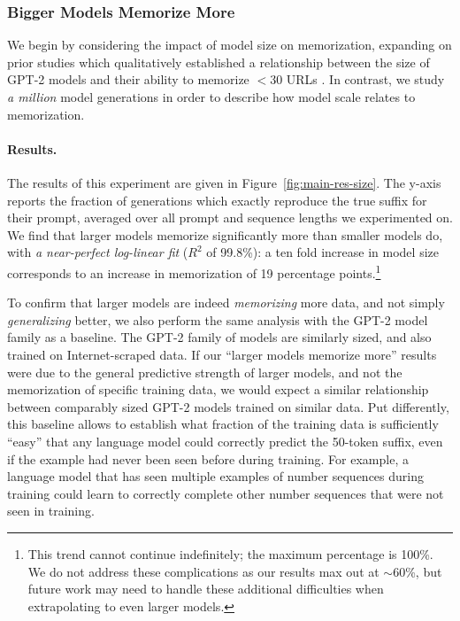 \subsubsection{Bigger Models Memorize More}
\label{sec:modelsize}
We begin by considering the impact of model size on memorization,
expanding on prior studies which qualitatively established a relationship between the size of GPT-2 models and their
ability to memorize $<$30 URLs \citep{carlini2020extracting}.
%
In contrast, we study \emph{a million} model generations in order to describe
how model scale relates to memorization.

\paragraph{Results.}
The results of this experiment are given in Figure~\ref{fig:main-res-size}.
%
The y-axis reports the fraction of generations which exactly reproduce the true suffix for their prompt, averaged over all prompt and sequence lengths we experimented on.
%
We find that larger models memorize significantly more than smaller models do, with \emph{a near-perfect log-linear fit} ($R^2$ of 99.8\%): a ten fold increase in model size corresponds to an increase in memorization of 19 percentage points.\footnote{This trend cannot continue indefinitely; the maximum percentage is 100\%.
We do not address these complications as our results max out at $\sim$60\%, but future work may need to handle these additional difficulties when extrapolating to even larger models.}

To confirm that larger models are indeed \emph{memorizing} more data, and not simply \emph{generalizing} better, we also perform the same analysis with the GPT-2 model family as a baseline. 
%
The GPT-2 family of models are similarly sized, and also trained on Internet-scraped data.
If our ``larger models memorize more'' results were due to the general predictive strength of larger models, and not the memorization of specific training data, we would expect a similar relationship between comparably sized GPT-2 models trained on similar data. 
%
Put differently, this baseline allows to establish
what fraction of the training data is sufficiently ``easy'' that any language model could correctly
predict the 50-token suffix, even if the example had never been seen before during training.
For example, a language model that has seen multiple examples of number sequences during training could learn to correctly complete other number sequences that were not seen in training.
%
%

